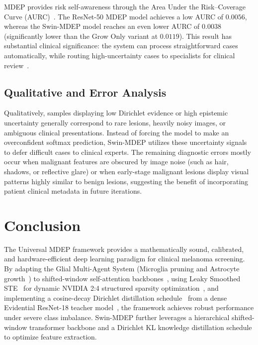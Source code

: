 \documentclass[letterpaper]{article} %
\begin{document}
MDEP provides risk self-awareness through the Area Under the Risk--Coverage Curve (AURC)~\cite{geifman2017selective, geifman2019selectivenet, jaeger2023call}. The ResNet-50 MDEP model achieves a low AURC of $0.0056$, whereas the Swin-MDEP model reaches an even lower AURC of $0.0038$ (significantly lower than the Grow Only variant at $0.0119$). This result has substantial clinical significance: the system can process straightforward cases automatically, while routing high-uncertainty cases to specialists for clinical review~\cite{esteva2017dermatologist}.

\subsection{Qualitative and Error Analysis}\label{subsec:qualitative}

Qualitatively, samples displaying low Dirichlet evidence or high epistemic uncertainty generally correspond to rare lesions, heavily noisy images, or ambiguous clinical presentations. Instead of forcing the model to make an overconfident softmax prediction, Swin-MDEP utilizes these uncertainty signals to defer difficult cases to clinical experts. The remaining diagnostic errors mostly occur when malignant features are obscured by image noise (such as hair, shadows, or reflective glare) or when early-stage malignant lesions display visual patterns highly similar to benign lesions, suggesting the benefit of incorporating patient clinical metadata in future iterations.

\section{Conclusion}\label{sec:conclusion}

The Universal MDEP framework provides a mathematically sound, calibrated, and hardware-efficient deep learning paradigm for clinical melanoma screening. By adapting the Glial Multi-Agent System (Microglia pruning and Astrocyte growth~\cite{chung2013astrocytes}) to shifted-window self-attention backbones~\cite{liu2021swin}, using Leaky Smoothed STE~\cite{bengio2013estimating} for dynamic NVIDIA 2:4 structured sparsity optimization~\cite{mishra2021accelerating}, and implementing a cosine-decay Dirichlet distillation schedule~\cite{hinton2015distilling} from a dense Evidential ResNet-18 teacher model~\cite{he2016deep}, the framework achieves robust performance under severe class imbalance. Swin-MDEP further leverages a hierarchical shifted-window transformer backbone and a Dirichlet KL knowledge distillation schedule to optimize feature extraction.
\end{document}
